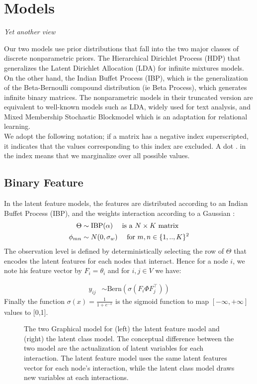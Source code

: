 \section{Models}
\emph{Yet another view} ~\\
\label{fig:bayes_net}

Our two models use prior distributions that fall into the two major classes of discrete nonparametric priors. The Hierarchical Dirichlet Process (HDP) that generalizes the Latent Dirichlet Allocation (LDA) for infinite mixtures models. On the other hand, the Indian Buffet Process (IBP), which is the generalization of the Beta-Bernoulli compound distribution (ie Beta Process), which generates infinite binary matrices. The nonparametric models in their truncated version are equivalent to well-known models such as LDA, widely used for text analysis, and Mixed Membership Stochastic Blockmodel which is an adaptation for relational learning.~\\


We adopt the following notation; if a matrix has a negative index superscripted, it indicates that the values corresponding to this index are excluded. A dot $\bm{.}$ in the index means that we marginalize over all possible values.


\subsection{Binary Feature}
In the latent feature models, the features are distributed according to an Indian Buffet Process (IBP), and the weights interaction according to a Gaussian :
\begin{align}
\Theta &\sim \mathrm{IBP}(\alpha)  \quad\textnormal{ is a } N\times K \textnormal{ matrix}\\
\phi_{mn} &\sim N(0, \sigma_w) \quad\textnormal{ for } m,n \in \{1, .., K\}^2
\end{align}
The observation level is defined by deterministically selecting the row of $\Theta$ that encodes the latent features for each nodes that interact. Hence for a node $i$, we note his feature vector by $F_i = \theta_i$ and for $i, j \in V$ we have:

\begin{align}
y_{ij} &\sim \mathrm{Bern}(\sigma(F_i \Phi F_j^\top))
\end{align}
Finally the function $\sigma(x)= \frac{1}{1 + e^{-x}}$ is the sigmoid function to map $[-\infty, +\infty]$ values to [0,1].

\begin{figure}[h]
	\centering
	\scalebox{0.88}{
	}
	\endminipage
	\scalebox{0.88}{
		}
	\endminipage
	\caption{The two Graphical model for (left) the latent feature model and (right) the latent class model. The conceptual difference between the two model are the actualization of latent variables for each interaction. The latent feature model uses the same latent features vector for each node's interaction, while the latent class model draws new variables at each interactions.}
	\label{fig:ilfrm}
\end{figure}


